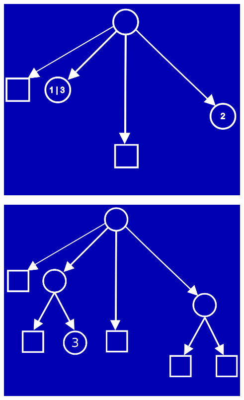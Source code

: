 \documentclass[a4paper,12pt, oneside]{book}
\begin{document}
\begin{center}
  \includegraphics[scale = 0.5]{img/suf3.png}
\end{center}
\begin{center}
  \includegraphics[scale = 0.5]{img/suf4.png}
\end{center}
\end{document}
